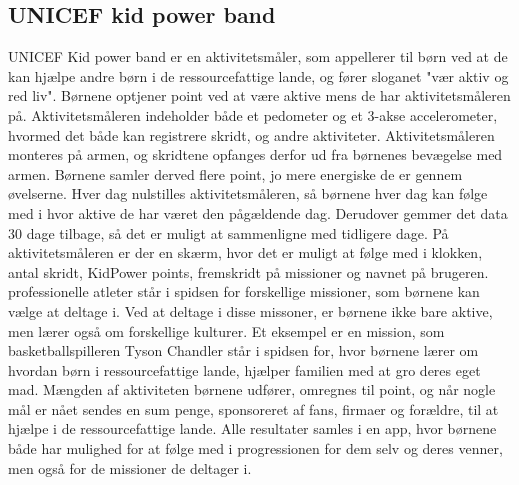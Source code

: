 \subsection{UNICEF kid power band}
UNICEF Kid power band er en aktivitetsmåler, som appellerer til børn ved at de kan hjælpe andre børn i de ressourcefattige lande, og fører sloganet "vær aktiv og red liv". Børnene optjener point ved at være  aktive mens de har aktivitetsmåleren på. Aktivitetsmåleren indeholder både et pedometer og et 3-akse accelerometer, hvormed det både kan registrere skridt, og andre aktiviteter. Aktivitetsmåleren monteres på armen, og skridtene opfanges derfor ud fra børnenes bevægelse med armen. Børnene samler derved flere point, jo mere energiske de er gennem øvelserne. Hver dag nulstilles aktivitetsmåleren, så børnene hver dag kan følge med i hvor aktive de har været den pågældende dag. Derudover gemmer det data 30 dage tilbage, så det er muligt at sammenligne med tidligere dage. På aktivitetsmåleren er der en skærm, hvor det er muligt at følge med i klokken, antal skridt, KidPower points, fremskridt på missioner og navnet på brugeren.\citep{PowerAbout2015,PowerManual2015} \newline 
professionelle atleter står i spidsen for forskellige missioner, som børnene kan vælge at deltage i. Ved at deltage i disse missoner, er børnene ikke bare aktive, men lærer også om forskellige kulturer. Et eksempel er en mission, som basketballspilleren Tyson Chandler står i spidsen for, hvor børnene lærer om hvordan børn i ressourcefattige lande, hjælper familien med at gro deres eget mad.\citep{PowerMission2015} \newline
Mængden af aktiviteten børnene udfører, omregnes til point, og når nogle mål er nået sendes en sum penge, sponsoreret af fans, firmaer og forældre, til at hjælpe i de ressourcefattige lande. \newline
Alle resultater samles i en app, hvor børnene både har mulighed for at følge med i progressionen for dem selv og deres venner, men også for de missioner de deltager i.\citep{PowerAbout2015}


